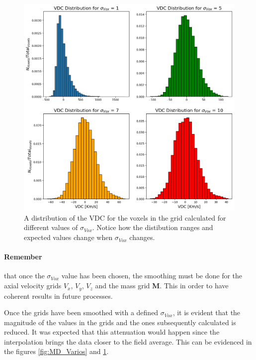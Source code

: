 \begin{figure}[!h]
    \centering
    \includegraphics[width=400pt]{VCD_varios.png}
    \caption{A distribution of the VDC for the voxels in the grid calculated for different values of $\sigma_{Vox}$. Notice how the distibution ranges and expected values change when $\sigma_{Vox}$ changes.}
    \label{fig:VCD_Varios}
\end{figure}


\paragraph{Remember}  that once the $\sigma_{Vox}$ value has been chosen, the smoothing must be done for the axial velocity grids $V_x$, $V_y$, $V_z$ and the mass grid \textbf{M}. This in order to have coherent results in future processes.




Once the grids have been smoothed with a defined $\sigma_{Vox}$, it is evident that the magnitude of the values in the grids and the ones subsequently calculated is reduced. It was expected that this attenuation would happen since the interpolation brings the data closer to the field average. This can be evidenced in the figures \ref{fig:MD_Varios} and \ref{fig:VCD_Varios}.





